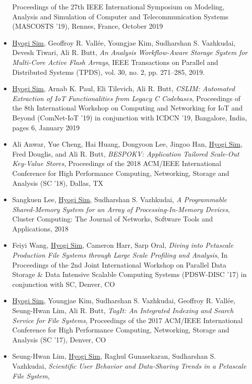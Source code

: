 \begin{itemize}
  Proceedings of the 27th IEEE International Symposium on Modeling, Analysis and Simulation of Computer and Telecommunication Systems
  (MASCOSTS '19), Rennes, France, October 2019
\item \underline{Hyogi Sim}, Geoffroy R. Vall\'ee,
	Youngjae Kim, Sudharshan S. Vazhkudai, Devesh Tiwari, Ali R. Butt,
  {\it An Analysis Workflow-Aware Storage System for Multi-Core Active Flash Arrays},
  IEEE Transactions on Parallel and Distributed Systems (TPDS), 
  vol. 30, no. 2, pp. 271–285, 2019.
\item \underline{Hyogi Sim}, Arnab K. Paul, Eli Tilevich, Ali R. Butt,
  {\it CSLIM: Automated Extraction of IoT Functionalities from Legacy C Codebases},
  Proceedings of the 8th International Workshop on Computing and Networking for
  IoT and Beyond (ComNet-IoT ’19) in conjunction with ICDCN '19, Bangalore,
  India, pages 6, January 2019
\item Ali Anwar, Yue Cheng, Hai Huang, Dongyoon Lee, Jingoo Han, \underline{Hyogi Sim},
  Fred Douglis, and Ali R. Butt,
  {\it BESPOKV: Application Tailored Scale-Out Key-Value Stores},
  Proceedings of the 2018 ACM/IEEE International Conference for High
  Performance Computing, Networking, Storage and Analysis (SC '18), Dallas, TX
\item Sangkuen Lee, \underline{Hyogi Sim}, Sudharshan S. Vazhkudai,
  {\it A Programmable Shared-Memory System for an Array of Processing-In-Memory Devices},
  Cluster Computing: The Journal of Networks, Software Tools and Applications, 2018
\item Feiyi Wang, \underline{Hyogi Sim}, Cameron Harr, Sarp Oral,
  {\it Diving into Petascale Production File Systems through
       Large Scale Profiling and Analysis},
  In Proceedings of the 2nd Joint International Workshop on Parallel Data Storage
  \& Data Intensive Scalable Computing Systems (PDSW-DISC '17)
  in conjunction with SC, Denver, CO
\item \underline{Hyogi Sim}, Youngjae Kim, Sudharshan S. Vazhkudai,
  Geoffroy R. Vall\'ee, Seung-Hwan Lim, Ali R. Butt,
  {\it TagIt: An Integrated Indexing and Search Service for File Systems},
  Proceedings of the 2017 ACM/IEEE International Conference for High
  Performance Computing, Networking, Storage and Analysis (SC '17), Denver, CO
\item Seung-Hwan Lim, \underline{Hyogi Sim}, Raghul Gunasekaran,
  Sudharshan S. Vazhkudai,
  {\it Scientific User Behavior and Data-Sharing Trends in a Petascale File System},

\end{itemize}
